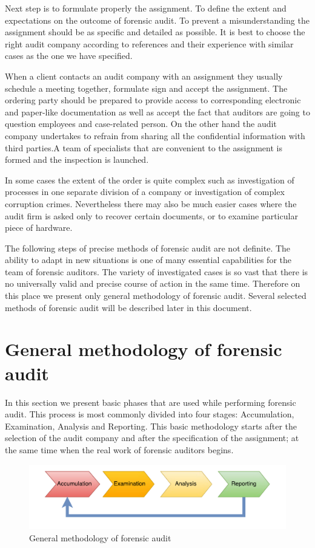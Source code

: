 Next step is to formulate properly the assignment. To define the extent and expectations on the outcome of forensic audit. To prevent a misunderstanding the assignment should be as specific and detailed as possible. It is best to choose the right audit company according to references and their experience with similar cases as the one we have specified.

When a client contacts an audit company with an assignment they usually schedule a meeting together, formulate sign and accept the assignment. The ordering party should be prepared to provide access to corresponding electronic and paper-like documentation as well as accept the fact that auditors are going to question employees and case-related person. On the other hand the audit company undertakes to refrain from sharing all the confidential information with third parties.A team of specialists that are convenient to the assignment is formed and the inspection is launched. 

In some cases the extent of the order is quite complex such as investigation of processes in one separate division of a company or investigation of complex corruption crimes. Nevertheless there may also be much easier cases where the audit firm is asked only to recover certain documents, or to examine particular piece of hardware. 

The following steps of precise methods of forensic audit are not definite. The ability to adapt in new situations is one of many essential capabilities for the team of forensic auditors. The variety of investigated cases is so vast that there is no universally valid and precise course of action in the same time. Therefore on this place we present only general methodology of forensic audit. Several selected methods of forensic audit will be described later in this document. 

\section{General methodology of forensic audit}
In this section we present basic phases that are used while performing forensic audit. This process is most commonly divided into four stages: Accumulation, Examination, Analysis and Reporting. This basic methodology starts after the  selection of the audit company and after the specification of the assignment; at the same time when the real work of forensic auditors begins.

\begin{figure}[h]
	\begin{center} 
	\includegraphics[width=1.0\textwidth]{img/general_methodology.pdf}
	\end{center}
	\caption{General methodology of forensic audit}
\end{figure}

